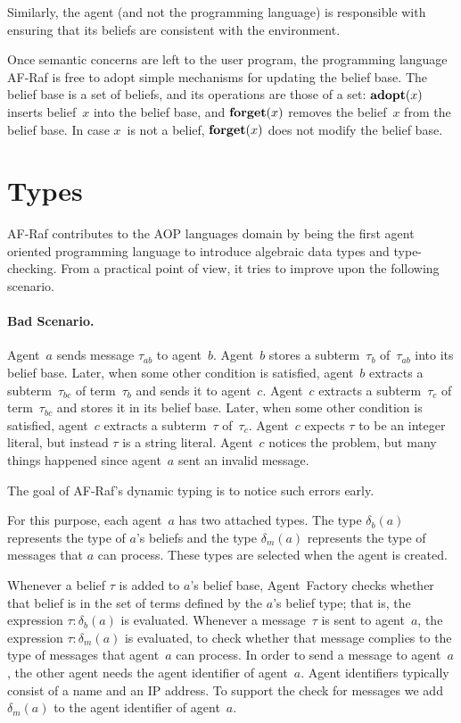 \documentclass[a4paper,12pt,oneside,fleqn]{book} %
\newcommand{\rg}[1]{\marginpar{\tiny\raggedright\textcolor{blue}{\bf rg:} #1}}
\renewcommand{\rg}{}
\begin{document}
{Similarly, the agent (and not the programming language) is responsible with
ensuring that its beliefs are consistent with the environment.

Once semantic concerns are left to the user program, the programming
language AF-Raf is free to adopt simple mechanisms for updating the belief
base.  The belief base is a set of beliefs, and its operations are those of
a set:  ${\bf adopt}(x)$ inserts belief~$x$ into the belief base, and ${\bf
forget}(x)$ removes the belief~$x$ from the belief base.  In case $x$~is
not a belief, ${\bf forget}(x)$ does not modify the belief base.

\section{Types}\label{sec:types} %

AF-Raf contributes to the AOP languages domain by being the first agent
oriented programming language to introduce algebraic data types and
type-checking. From a practical point of view, it tries to improve
upon the following scenario.

\paragraph{Bad Scenario.}

Agent~$a$ sends message $\tau_{ab}$ to agent~$b$. Agent~$b$ stores a
subterm~$\tau_b$ of~$\tau_{ab}$ into its belief base. Later, when some
other condition is satisfied, agent~$b$ extracts a subterm~$\tau_{bc}$ of
term~$\tau_b$ and sends it to agent~$c$. Agent~$c$ extracts a
subterm~$\tau_c$ of term~$\tau_{bc}$ and stores it in its belief base.
Later, when some other condition is satisfied, agent~$c$ extracts a
subterm~$\tau$ of~$\tau_c$. Agent~$c$ expects $\tau$ to be an integer
literal, but instead $\tau$ is a string literal. Agent~$c$ notices the
problem, but many things happened since agent~$a$ sent an invalid message.

The goal of AF-Raf's dynamic typing is to notice such errors early.

For this purpose, each agent~$a$ has two attached types. The type $\delta_b(a)$
represents the type of $a$'s beliefs and the type $\delta_m(a)$ represents the
type of messages that $a$ can process. These types are selected when the agent
is created.

Whenever a belief $\tau$ is added to $a$'s belief base, Agent~Factory checks
whether that belief is in the set of terms defined by the $a$'s belief type;
that is, the expression $\tau:\delta_b(a)$ is evaluated.  Whenever a
message~$\tau$ is sent to agent~$a$, the expression $\tau:\delta_m(a)$ is
evaluated, to check whether that message complies to the type of messages that
agent~$a$ can process. In order to send a message to agent~$a$, the other agent
needs the agent identifier of agent~$a$. Agent identifiers typically consist of
a name and an IP address. To support the check for messages we add
$\delta_m(a)$ to the agent identifier of agent~$a$.


}
\end{document}
